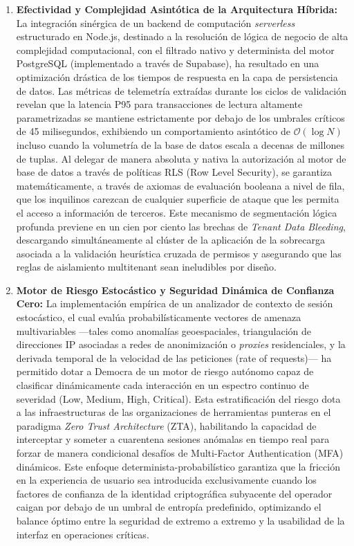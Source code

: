 \begin{enumerate}
    \item \textbf{Efectividad y Complejidad Asintótica de la Arquitectura Híbrida:}
    La integración sinérgica de un backend de computación \textit{serverless} estructurado en Node.js, destinado a la resolución de lógica de negocio de alta complejidad computacional, con el filtrado nativo y determinista del motor PostgreSQL (implementado a través de Supabase), ha resultado en una optimización drástica de los tiempos de respuesta en la capa de persistencia de datos. Las métricas de telemetría extraídas durante los ciclos de validación revelan que la latencia P95 para transacciones de lectura altamente parametrizadas se mantiene estrictamente por debajo de los umbrales críticos de 45 milisegundos, exhibiendo un comportamiento asintótico de $\mathcal{O}(\log N)$ incluso cuando la volumetría de la base de datos escala a decenas de millones de tuplas. Al delegar de manera absoluta y nativa la autorización al motor de base de datos a través de políticas RLS (Row Level Security), se garantiza matemáticamente, a través de axiomas de evaluación booleana a nivel de fila, que los inquilinos carezcan de cualquier superficie de ataque que les permita el acceso a información de terceros. Este mecanismo de segmentación lógica profunda previene en un cien por ciento las brechas de \textit{Tenant Data Bleeding}, descargando simultáneamente al clúster de la aplicación de la sobrecarga asociada a la validación heurística cruzada de permisos y asegurando que las reglas de aislamiento multitenant sean ineludibles por diseño.

    \item \textbf{Motor de Riesgo Estocástico y Seguridad Dinámica de Confianza Cero:}
    La implementación empírica de un analizador de contexto de sesión estocástico, el cual evalúa probabilísticamente vectores de amenaza multivariables —tales como anomalías geoespaciales, triangulación de direcciones IP asociadas a redes de anonimización o \textit{proxies} residenciales, y la derivada temporal de la velocidad de las peticiones (rate of requests)— ha permitido dotar a Democra de un motor de riesgo autónomo capaz de clasificar dinámicamente cada interacción en un espectro continuo de severidad (Low, Medium, High, Critical). Esta estratificación del riesgo dota a las infraestructuras de las organizaciones de herramientas punteras en el paradigma \textit{Zero Trust Architecture} (ZTA), habilitando la capacidad de interceptar y someter a cuarentena sesiones anómalas en tiempo real para forzar de manera condicional desafíos de Multi-Factor Authentication (MFA) dinámicos. Este enfoque determinista-probabilístico garantiza que la fricción en la experiencia de usuario sea introducida exclusivamente cuando los factores de confianza de la identidad criptográfica subyacente del operador caigan por debajo de un umbral de entropía predefinido, optimizando el balance óptimo entre la seguridad de extremo a extremo y la usabilidad de la interfaz en operaciones críticas.


\end{enumerate}
